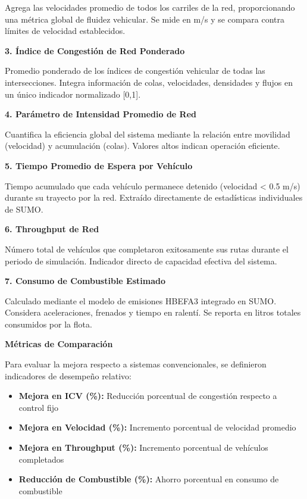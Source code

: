 \documentclass[12pt,a4paper,oneside]{report}
\begin{document}
Agrega las velocidades promedio de todos los carriles de la red, proporcionando una métrica global de fluidez vehicular. Se mide en m/s y se compara contra límites de velocidad establecidos.

\textbf{3. Índice de Congestión de Red Ponderado}

Promedio ponderado de los índices de congestión vehicular de todas las intersecciones. Integra información de colas, velocidades, densidades y flujos en un único indicador normalizado {[}0,1{]}.

\textbf{4. Parámetro de Intensidad Promedio de Red}

Cuantifica la eficiencia global del sistema mediante la relación entre movilidad (velocidad) y acumulación (colas). Valores altos indican operación eficiente.

\textbf{5. Tiempo Promedio de Espera por Vehículo}

Tiempo acumulado que cada vehículo permanece detenido (velocidad \textless{} 0.5 m/s) durante su trayecto por la red. Extraído directamente de estadísticas individuales de SUMO.

\textbf{6. Throughput de Red}

Número total de vehículos que completaron exitosamente sus rutas durante el periodo de simulación. Indicador directo de capacidad efectiva del sistema.

\textbf{7. Consumo de Combustible Estimado}

Calculado mediante el modelo de emisiones HBEFA3 integrado en SUMO. Considera aceleraciones, frenados y tiempo en ralentí. Se reporta en litros totales consumidos por la flota.

\textbf{Métricas de Comparación}

Para evaluar la mejora respecto a sistemas convencionales, se definieron indicadores de desempeño relativo:

\begin{itemize}
\item
  \textbf{Mejora en ICV (\%):} Reducción porcentual de congestión respecto a control fijo
\item
  \textbf{Mejora en Velocidad (\%):} Incremento porcentual de velocidad promedio
\item
  \textbf{Mejora en Throughput (\%):} Incremento porcentual de vehículos completados
\item
  \textbf{Reducción de Combustible (\%):} Ahorro porcentual en consumo de combustible
\end{itemize}
\end{document}
